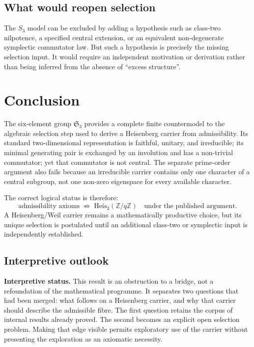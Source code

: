 \documentclass[11pt,a4paper]{article}
\newcommand{\Heis}{\mathrm{Heis}_3}
\newcommand{\Sym}{\mathfrak{S}}
\begin{document}
\subsection{What would reopen selection}

The \(S_3\) model can be excluded by adding a hypothesis such as class-two nilpotence, a specified central
extension, or an equivalent non-degenerate symplectic commutator law.
But such a hypothesis is precisely the missing selection input.
It would require an independent motivation or derivation rather than being inferred from the absence of
``excess structure''.

\section{Conclusion}
\label{sec:conclusion}

The six-element group \(\Sym_3\) provides a complete finite countermodel to the algebraic selection step used
to derive a Heisenberg carrier from admissibility.
Its standard two-dimensional representation is faithful, unitary, and irreducible; its minimal generating
pair is exchanged by an involution and has a non-trivial commutator; yet that commutator is not central.
The separate prime-order argument also fails because an irreducible carrier contains only one character of
a central subgroup, not one non-zero eigenspace for every available character.

The correct logical status is therefore:
\[
\text{admissibility axioms}
\;\not\Longrightarrow\;
\Heis(\mathbb{Z}/q\mathbb{Z})
\quad\text{under the published argument}.
\]
A Heisenberg/Weil carrier remains a mathematically productive choice, but its unique selection is postulated
until an additional class-two or symplectic input is independently established.

\subsection*{Interpretive outlook}

\textbf{Interpretive status.}
This result is an obstruction to a bridge, not a refoundation of the mathematical programme.
It separates two questions that had been merged: what follows on a Heisenberg carrier, and why that carrier
should describe the admissible fibre.
The first question retains the corpus of internal results already proved.
The second becomes an explicit open selection problem.
Making that edge visible permits exploratory use of the carrier without presenting the exploration as an
axiomatic necessity.


\end{document}
